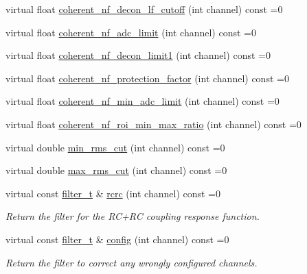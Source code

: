 \begin{DoxyCompactItemize}
\item 
virtual float \hyperlink{class_wire_cell_1_1_i_channel_noise_database_a4104509a65ce9fe5a77fac6ddd39ec56}{coherent\+\_\+nf\+\_\+decon\+\_\+lf\+\_\+cutoff} (int channel) const =0
\item 
virtual float \hyperlink{class_wire_cell_1_1_i_channel_noise_database_ac75b3b6b0c7368c0c87d907012abaf9d}{coherent\+\_\+nf\+\_\+adc\+\_\+limit} (int channel) const =0
\item 
virtual float \hyperlink{class_wire_cell_1_1_i_channel_noise_database_a4b2033312603fd90885efdfe14eb71cc}{coherent\+\_\+nf\+\_\+decon\+\_\+limit1} (int channel) const =0
\item 
virtual float \hyperlink{class_wire_cell_1_1_i_channel_noise_database_a4572de7acbdd4427cc4c409193abaae8}{coherent\+\_\+nf\+\_\+protection\+\_\+factor} (int channel) const =0
\item 
virtual float \hyperlink{class_wire_cell_1_1_i_channel_noise_database_a1668979331fd999d36d5cb5bb1ed00d6}{coherent\+\_\+nf\+\_\+min\+\_\+adc\+\_\+limit} (int channel) const =0
\item 
virtual float \hyperlink{class_wire_cell_1_1_i_channel_noise_database_a3fab0404aa8a10ad7ed2ac7afd2fe9a7}{coherent\+\_\+nf\+\_\+roi\+\_\+min\+\_\+max\+\_\+ratio} (int channel) const =0
\item 
virtual double \hyperlink{class_wire_cell_1_1_i_channel_noise_database_ad0e7e7c3424260af2bd426e578ad83f6}{min\+\_\+rms\+\_\+cut} (int channel) const =0
\item 
virtual double \hyperlink{class_wire_cell_1_1_i_channel_noise_database_ad5e4a49ff6b257e2ef290eeeaba95da7}{max\+\_\+rms\+\_\+cut} (int channel) const =0
\item 
virtual const \hyperlink{class_wire_cell_1_1_i_channel_noise_database_a0acbae29743542eb1c652f7a56e692f5}{filter\+\_\+t} \& \hyperlink{class_wire_cell_1_1_i_channel_noise_database_a8f9fa5547062c23f689fde9bb810361b}{rcrc} (int channel) const =0
\begin{DoxyCompactList}\small\item\em Return the filter for the R\+C+\+RC coupling response function. \end{DoxyCompactList}\item 
virtual const \hyperlink{class_wire_cell_1_1_i_channel_noise_database_a0acbae29743542eb1c652f7a56e692f5}{filter\+\_\+t} \& \hyperlink{class_wire_cell_1_1_i_channel_noise_database_af6887aa00ed134c7fcb1ee85bd950311}{config} (int channel) const =0
\begin{DoxyCompactList}\small\item\em Return the filter to correct any wrongly configured channels. \end{DoxyCompactList}\item 

\end{DoxyCompactItemize}
